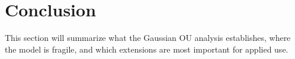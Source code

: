 \section{Conclusion}

This section will summarize what the Gaussian OU analysis establishes, where the model is fragile, and which extensions are most important for applied use.
